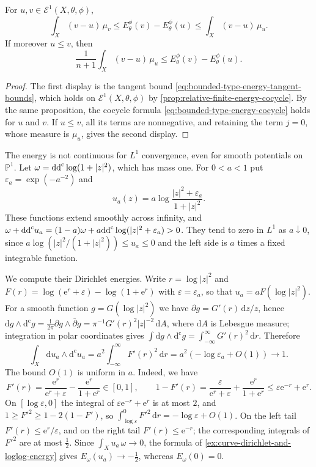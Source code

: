 \begin{lemma}\label{lem:relative-energy-tangent-and-order-bounds}
For $u,v\in\mathcal E^1(X,\theta,\phi)$,
\[
 \int_X(v-u)\,\mu_v\leq E_\theta^\phi(v)-E_\theta^\phi(u)
                                  \leq\int_X(v-u)\,\mu_u.
\]
If moreover $u\leq v$, then
\[
 \frac1{n+1}\int_X(v-u)\,\mu_u\leq E_\theta^\phi(v)-E_\theta^\phi(u).
\]
\end{lemma}
\begin{proof}
The first display is the tangent bound \eqref{eq:bounded-type-energy-tangent-bounds}, which holds on $\mathcal E^1(X,\theta,\phi)$ by \cref{prop:relative-finite-energy-cocycle}. By the same proposition, the cocycle formula \eqref{eq:bounded-type-energy-cocycle} holds for $u$ and $v$. If $u\leq v$, all its terms are nonnegative, and retaining the term $j=0$, whose measure is $\mu_u$, gives the second display.
\end{proof}

\begin{example}\label{ex:lone-convergence-energy-drop}
The energy is not continuous for $L^1$ convergence, even for smooth potentials on $\mathbb P^1$. Let $\omega=\mathrm{dd}^{\mathrm{c}}\log(1+|z|^2)$, which has mass one. For $0<a<1$ put $\varepsilon_a=\exp(-a^{-2})$ and
\[
 u_a(z)=a\log\frac{|z|^2+\varepsilon_a}{1+|z|^2}.
\]
These functions extend smoothly across infinity, and $\omega+\mathrm{dd}^{\mathrm{c}} u_a=(1-a)\omega+a\mathrm{dd}^{\mathrm{c}}\log(|z|^2+\varepsilon_a)>0$. They tend to zero in $L^1$ as $a\downarrow0$, since $a\log(|z|^2/(1+|z|^2))\leq u_a\leq0$ and the left side is $a$ times a fixed integrable function.

We compute their Dirichlet energies. Write $r=\log|z|^2$ and $F(r)=\log(\mathrm e^r+\varepsilon)-\log(1+\mathrm e^r)$ with $\varepsilon=\varepsilon_a$, so that $u_a=aF(\log|z|^2)$. For a smooth function $g=G(\log|z|^2)$ we have $\partial g=G'(r)\,\mathrm dz/z$, hence $\mathrm dg\wedge\mathrm d^{\mathrm c}g=\frac{\mathrm i}{2\pi}\partial g\wedge\bar\partial g=\pi^{-1}G'(r)^2|z|^{-2}\,\mathrm dA$, where $\mathrm dA$ is Lebesgue measure; integration in polar coordinates gives $\int\mathrm dg\wedge\mathrm d^{\mathrm c}g=\int_{-\infty}^\infty G'(r)^2\,\mathrm dr$. Therefore
\[
 \int_X\mathrm du_a\wedge\mathrm d^{\mathrm c}u_a
             =a^2\int_{-\infty}^\infty F'(r)^2\,\mathrm dr
             =a^2(-\log\varepsilon_a+O(1))\longrightarrow1.
\]
The bound $O(1)$ is uniform in $a$. Indeed, we have
\[
 F'(r)=\frac{\mathrm e^r}{\mathrm e^r+\varepsilon}-\frac{\mathrm e^r}{1+\mathrm e^r}\in[0,1],\qquad
 1-F'(r)=\frac{\varepsilon}{\mathrm e^r+\varepsilon}+\frac{\mathrm e^r}{1+\mathrm e^r}\leq\varepsilon\mathrm e^{-r}+\mathrm e^r.
\]
On $[\log\varepsilon,0]$ the integral of $\varepsilon\mathrm e^{-r}+\mathrm e^r$ is at most $2$, and $1\geq F'^2\geq1-2(1-F')$, so $\int_{\log\varepsilon}^0F'^2\,\mathrm dr=-\log\varepsilon+O(1)$. On the left tail $F'(r)\leq\mathrm e^r/\varepsilon$, and on the right tail $F'(r)\leq\mathrm e^{-r}$; the corresponding integrals of $F'^2$ are at most $\frac12$. Since $\int_Xu_a\,\omega\to0$, the formula of \cref{ex:curve-dirichlet-and-loglog-energy} gives $E_\omega(u_a)\to-\frac12$, whereas $E_\omega(0)=0$.
\end{example}


